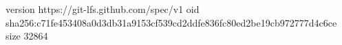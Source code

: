 version https://git-lfs.github.com/spec/v1
oid sha256:c71fe453408a0d3db31a9153cf539cd2ddfe836fc80ed2be19cb972777d4c6ce
size 32864
